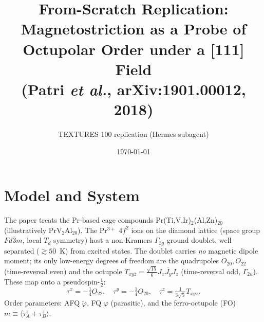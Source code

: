 \documentclass[11pt]{article}
\title{From-Scratch Replication: Magnetostriction as a Probe of\\
Octupolar Order under a [111] Field\\
\large (Patri \textit{et al.}, arXiv:1901.00012, 2018)}
\author{TEXTURES-100 replication (Hermes subagent)}
\date{\today}
\begin{document}
\maketitle

\section{Model and System}
The paper treats the Pr-based cage compounds Pr(Ti,V,Ir)$_2$(Al,Zn)$_{20}$
(illustratively PrV$_2$Al$_{20}$). The Pr$^{3+}$ $4f^2$ ions on the diamond
lattice (space group $Fd\bar{3}m$, local $T_d$ symmetry) host a non-Kramers
$\Gamma_{3g}$ ground doublet, well separated ($\gtrsim 50$~K) from excited
states. The doublet carries \emph{no} magnetic dipole moment; its only low-energy
degrees of freedom are the quadrupoles $O_{20},O_{22}$ (time-reversal even) and
the octupole $T_{xyz}=\tfrac{\sqrt{15}}{6}\overline{J_xJ_yJ_z}$ (time-reversal
odd, $\Gamma_{2u}$). These map onto a pseudospin-$\tfrac12$:
\begin{equation}
\tau^x=-\tfrac14 O_{22},\quad \tau^y=-\tfrac14 O_{20},\quad
\tau^z=\tfrac{1}{3\sqrt5}T_{xyz}.
\end{equation}
Order parameters: AFQ $\tilde\varphi$, FQ $\varphi$ (parasitic), and the
ferro-octupole (FO) $m\equiv\langle\tau^z_A+\tau^z_B\rangle$.
\end{document}
